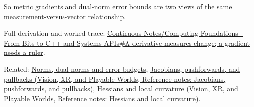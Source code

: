 So metric gradients and dual-norm error bounds are two views of the same measurement-versus-vector relationship.

Full derivation and worked trace: \hyperref[01-foundations-i-ch018-a-derivative-measures-change-a-gradient-needs-a-ruler]{Continuous Notes/Computing Foundations - From Bits to C++ and Systems APIs\#A derivative measures change; a gradient needs a ruler}.

Related: \hyperref[appendix-d6d9dbbe3c14]{Norms, dual norms and error budgets}, \href{../07-Vision-XR-and-Playable-Worlds/main.pdf\#nameddest=appendix-d8a7ddb675eb}{Jacobians, pushforwards, and pullbacks (Vision, XR, and Playable Worlds, Reference notes: Jacobians, pushforwards, and pullbacks)}, \href{../07-Vision-XR-and-Playable-Worlds/main.pdf\#nameddest=appendix-6ac071f8b50c}{Hessians and local curvature (Vision, XR, and Playable Worlds, Reference notes: Hessians and local curvature)}.
